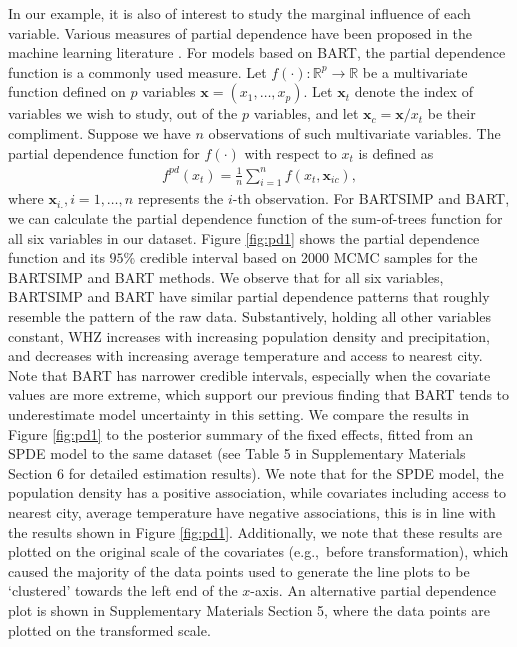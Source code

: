 \documentclass[preprint,12pt,authoryear]{elsarticle}
\begin{document}
{In our example, it is also of  interest to study the marginal influence of each variable. Various measures of partial dependence have been proposed in the machine learning literature \citep{breiman2001random, goldstein2015peeking}.  For models based on BART, the partial dependence function \citep{friedman2001greedy} is a commonly used measure. Let $f(\cdot): \mathbb{R}^p \rightarrow \mathbb{R}$ be a multivariate function defined on $p$ variables $\boldsymbol{x}= (x_1, \dots, x_p) $. Let $\boldsymbol{x}_t$ denote the index of variables we wish to study, out of the $p$ variables, and let $\boldsymbol{x}_c = \boldsymbol{x} \slash {x}_t$ be their compliment. Suppose we have $n$ observations of such multivariate variables. The partial dependence function for $f(\cdot)$ with respect to ${x}_t$ is defined as 
\begin{align*}
	f^{pd}({x}_t) = \frac{1}{n} \sum_{i=1}^n f({x}_t, \boldsymbol{x}_{ic}),
\end{align*}
where $\boldsymbol{x}_{i.}, i = 1, \dots, n$ represents the $i$-th observation. For BARTSIMP and BART, we can calculate the partial dependence function of the sum-of-trees function for all six variables in our dataset. Figure \ref{fig:pd1} shows the partial dependence function and its $95\%$ credible interval based on {2000 MCMC samples for the BARTSIMP and BART methods. We observe that for all six variables, BARTSIMP and BART have similar partial dependence patterns that roughly resemble the pattern of the raw data. Substantively, holding all other variables constant, WHZ increases with increasing population density and precipitation, and decreases with increasing average temperature and access to nearest city. Note that BART has narrower credible intervals, especially when the covariate values are more extreme, which support our previous finding that BART tends to underestimate model uncertainty in this setting. We compare the results in Figure \ref{fig:pd1} to the posterior summary of the fixed effects, fitted from an SPDE model to the same dataset (see Table 5 in Supplementary Materials Section 6 for detailed estimation results). We note that for the SPDE model, the population density has a  positive association, while covariates including access to nearest city, average temperature have negative associations, this is in line with the results shown in Figure \ref{fig:pd1}. Additionally, we note that these results are plotted on the original scale of the covariates (e.g.,~before transformation), which caused the majority of the data points used to generate the line plots to be `clustered' towards the left end of the $x$-axis. An alternative partial dependence plot is shown in Supplementary Materials Section 5, where the data points are plotted on the transformed scale. }

}
\end{document}
